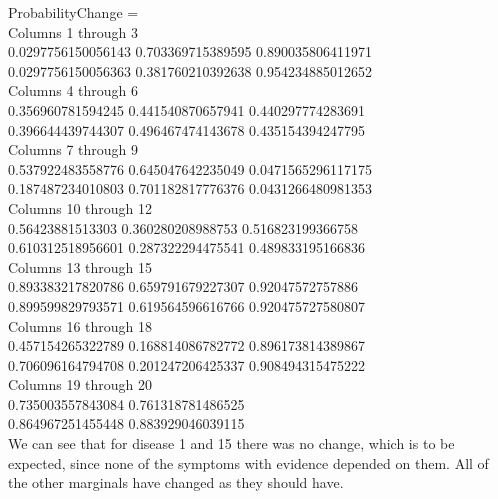 \documentclass[11pt,a4paper,oneside]{report}
\begin{document}
ProbabilityChange =\\
  Columns 1 through 3\\
        0.0297756150056143         0.703369715389595         0.890035806411971\\
        0.0297756150056363         0.381760210392638         0.954234885012652\\
  Columns 4 through 6\\
         0.356960781594245         0.441540870657941         0.440297774283691\\
         0.396644439744307         0.496467474143678         0.435154394247795\\
  Columns 7 through 9\\
         0.537922483558776         0.645047642235049        0.0471565296117175\\
         0.187487234010803         0.701182817776376        0.0431266480981353\\
  Columns 10 through 12\\
          0.56423881513303         0.360280208988753         0.516823199366758\\
         0.610312518956601         0.287322294475541         0.489833195166836\\
  Columns 13 through 15\\
         0.893383217820786         0.659791679227307          0.92047572757886\\
         0.899599829793571         0.619564596616766         0.920475727580807\\
  Columns 16 through 18\\
         0.457154265322789         0.168814086782772         0.896173814389867\\
         0.706096164794708         0.201247206425337         0.908494315475222\\
  Columns 19 through 20\\
         0.735003557843084         0.761318781486525\\
         0.864967251455448         0.883929046039115\\
         
	We can see that for disease 1 and 15 there was no change, which is to be expected, since none of the symptoms with evidence depended on them. All of the other marginals have changed as they should have.         
\end{document}
